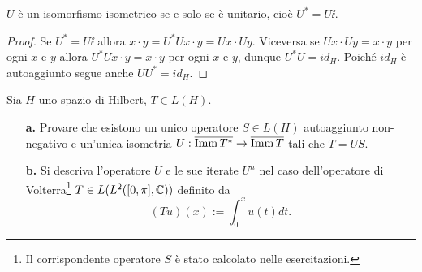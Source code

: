 \documentclass[a4paper]{article}
\begin{document}


\begin{lemma}[]\label{LmUnitarioCoincideConIsometria}
$U$ \`e un isomorfismo isometrico se e solo se \`e unitario, cio\`e $U^\ast=U\ii$.
\end{lemma}
\begin{proof}
Se $U^\ast=U\ii$ allora $x\cdot y=U^\ast Ux\cdot y=Ux\cdot Uy$. 
Viceversa se $Ux\cdot Uy=x\cdot y$ per ogni $x$ e $y$ allora $U^\ast Ux\cdot y=x\cdot y$ per ogni $x$ e $y$, dunque $U^\ast U=id_H$. Poich\'e $id_H$ \`e autoaggiunto segue anche $UU^\ast=id_H$.
\end{proof}

\begin{exercise}
Sia $H$ uno spazio di Hilbert, $T\in L(H)$.
\begin{enumerate}
\item[\textbf{a.}] Provare che esistono un unico operatore $S\in L(H)$ autoaggiunto non-negativo e un'unica isometria $U:\overline{\operatorname{Imm} T^\ast}\to \overline{\operatorname{Imm} T}$ tali che $T=US$.
\item[\textbf{b.}] Si descriva l'operatore $U$ e le sue iterate $U^n$ nel caso dell'operatore di Volterra\footnote{Il corrispondente operatore $S$ \`e stato calcolato nelle esercitazioni.} $T\in L(L^2([0,\pi],\mathbb{C}))$ definito da
\[(Tu)(x):=\int_0^xu(t)dt.\] 
\end{enumerate}
\end{exercise}
\end{document}
